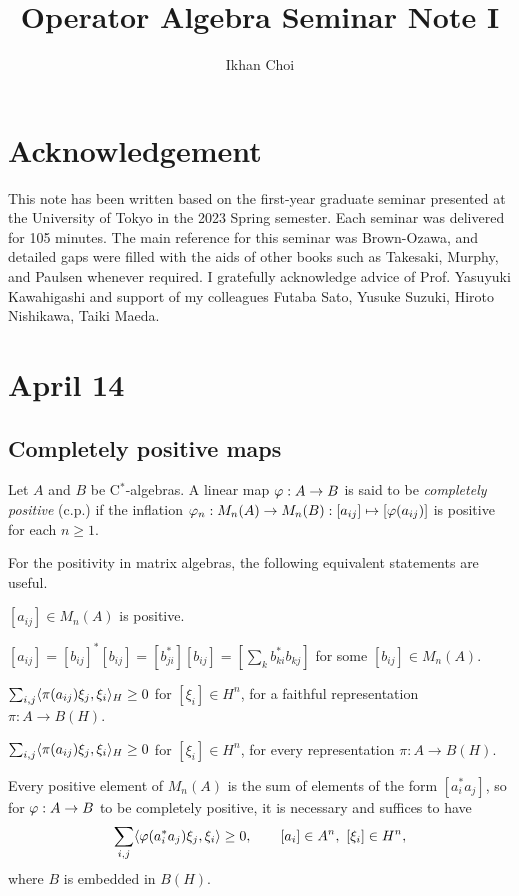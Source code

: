 \documentclass{../../../small}
\begin{document}
\title{Operator Algebra Seminar Note I}
\author{Ikhan Choi}
\maketitle
\tableofcontents


\section*{Acknowledgement}
This note has been written based on the first-year graduate seminar presented at the University of Tokyo in the 2023 Spring semester.
Each seminar was delivered for 105 minutes.
The main reference for this seminar was Brown-Ozawa, and detailed gaps were filled with the aids of other books such as Takesaki, Murphy, and Paulsen whenever required.
I gratefully acknowledge advice of Prof. Yasuyuki Kawahigashi and support of my colleagues Futaba Sato, Yusuke Suzuki, Hiroto Nishikawa, Taiki Maeda.



\newpage
\section{April 14}

\subsection{Completely positive maps}

\begin{defn}
Let $A$ and $B$ be C$^*$-algebras.
A linear map $\varphi:A\to B$ is said to be \emph{completely positive} (c.p.) if the inflation $\varphi_n:M_n(A)\to M_n(B):[a_{ij}]\mapsto[\varphi(a_{ij})]$ is positive for each $n\ge1$.
\end{defn}

\begin{rmk}
For the positivity in matrix algebras, the following equivalent statements are useful.
\begin{parts}
\item $[a_{ij}]\in M_n(A)$ is positive.
\item $[a_{ij}]=[b_{ij}]^*[b_{ij}]=[b_{ji}^*][b_{ij}]=[\sum_kb_{ki}^*b_{kj}]$ for some $[b_{ij}]\in M_n(A)$.
\item $\sum_{i,j}\langle\pi(a_{ij})\xi_j,\xi_i\rangle_H\ge0$ for $[\xi_i]\in H^n$, for a faithful representation $\pi:A\to B(H)$.
\item $\sum_{i,j}\langle\pi(a_{ij})\xi_j,\xi_i\rangle_H\ge0$ for $[\xi_i]\in H^n$, for every representation $\pi:A\to B(H)$.
\end{parts}
Every positive element of $M_n(A)$ is the sum of elements of the form $[a_i^*a_j]$, so for $\varphi:A\to B$ to be completely positive, it is necessary and suffices to have
\[\sum_{i,j}\langle\varphi(a_i^*a_j)\xi_j,\xi_i\rangle\ge0,\qquad [a_i]\in A^n,\ [\xi_i]\in H^n,\]
where $B$ is embedded in $B(H)$.
\end{rmk}
\end{document}
